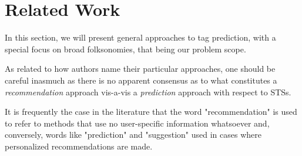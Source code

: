 \chapter{Related Work}\label{chap:related_work}


In this section, we will present general approaches to tag prediction, with a special focus on broad folksonomies, that being our problem scope.



As related to how authors name their particular approaches, one should be careful inasmuch as there is no apparent consensus as to what constitutes a \textit{recommendation} approach vis-a-vis a \textit{prediction} approach with respect to STSs. 

It is frequently the case in the literature that the word "recommendation" is used to refer to methods that use no user-specific information whatsoever and, conversely, words like "prediction" and "suggestion" used in cases where personalized recommendations are made.







